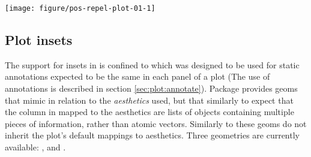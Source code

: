 \documentclass[krantz2]{krantz}\usepackage{knitr}%
\begin{document}
\begin{knitrout}\footnotesize
{}\color{fgcolor}\begin{kframe}
\begin{alltt}
\hlstd{(}  \hlstd{(}   
                           \hlstd{=} 
                           
                            \hlopt{+}
  \hlstd{()} \hlopt{+}
  \hlstd{(} \hlstd{=} \hlopt{/}\hlstd{)} \hlopt{+}
  \hlstd{(} \hlstd{=} \hlstd{,}  \hlstd{=} \hlstd{,}
                   \hlstd{=} \hlstd{,}  \hlstd{=} \hlstd{)}
\end{alltt}
\end{kframe}

{\centering \texttt{[image: figure/pos-repel-plot-01-1]} 

}



\end{knitrout}

\subsection{Plot insets}\label{sec:plot:insets}

The support for insets in  is confined to  which was designed to be used for static annotations expected to be the same in each panel of a plot (The use of annotations is described in section \ref{sec:plot:annotate}). Package  provides geoms that mimic  in relation to the \emph{aesthetics} used, but that similarly to  expect that the column in  mapped to the  aesthetics are lists of objects containing multiple pieces of information, rather than atomic vectors. Similarly to  these geoms do not inherit the plot's default mappings to aesthetics. Three geometries are currently available: ,  and .
\end{document}
